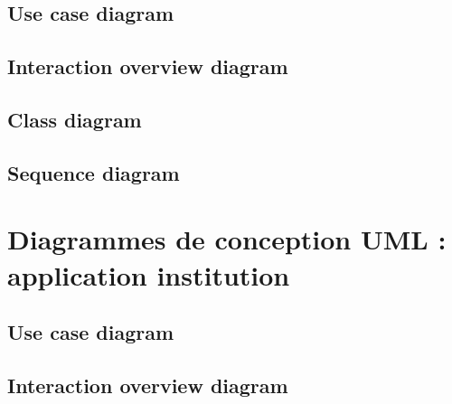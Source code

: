 \documentclass[]{report}
\begin{document}
\subsection{Use case diagram}



\newpage

\subsection{Interaction overview diagram}



\newpage

\subsection{Class diagram}



\newpage

\subsection{Sequence diagram}



\newpage



\section{Diagrammes de conception UML : application institution}



\subsection{Use case diagram}



\newpage

\subsection{Interaction overview diagram}



\newpage
\end{document}
